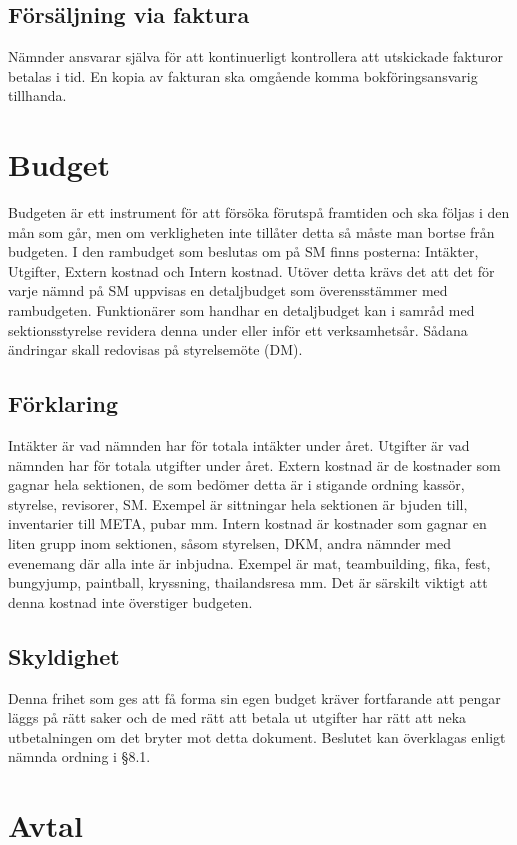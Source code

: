 \documentclass{dgovdoc}
\begin{document}
\subsection{Försäljning via faktura}
Nämnder ansvarar själva för att kontinuerligt kontrollera att utskickade fakturor betalas i tid. En kopia av
fakturan ska omgående komma bokföringsansvarig tillhanda.

\section{Budget}
Budgeten är ett instrument för att försöka förutspå framtiden och ska följas i den mån som går, men om verkligheten inte tillåter detta så måste man bortse från budgeten. I den rambudget som beslutas om på SM finns posterna: Intäkter, Utgifter, Extern kostnad och Intern kostnad. Utöver detta krävs det att det för varje nämnd på SM uppvisas en detaljbudget som överensstämmer med rambudgeten. Funktionärer som handhar en detaljbudget kan i samråd med sektionsstyrelse revidera denna under eller inför ett verksamhetsår. Sådana ändringar skall redovisas på styrelsemöte (DM).

\subsection{Förklaring}
Intäkter är vad nämnden har för totala intäkter under året. Utgifter är vad nämnden har för totala utgifter under året. Extern kostnad är de kostnader som gagnar hela sektionen, de som bedömer detta är i stigande ordning kassör, styrelse, revisorer, SM. Exempel är sittningar hela sektionen är bjuden till, inventarier till META, pubar mm. Intern kostnad är kostnader som gagnar en liten grupp inom sektionen, såsom styrelsen, DKM, andra nämnder med evenemang där alla inte är inbjudna. Exempel är mat, teambuilding, fika, fest, bungyjump, paintball, kryssning, thailandsresa mm. Det är särskilt viktigt att denna kostnad inte överstiger budgeten.

\subsection{Skyldighet}
Denna frihet som ges att få forma sin egen budget kräver fortfarande att pengar läggs på rätt saker och de med rätt att betala ut utgifter har rätt att neka utbetalningen om det bryter mot detta dokument. Beslutet kan överklagas enligt nämnda ordning i \S 8.1.

\section{Avtal}
\end{document}
